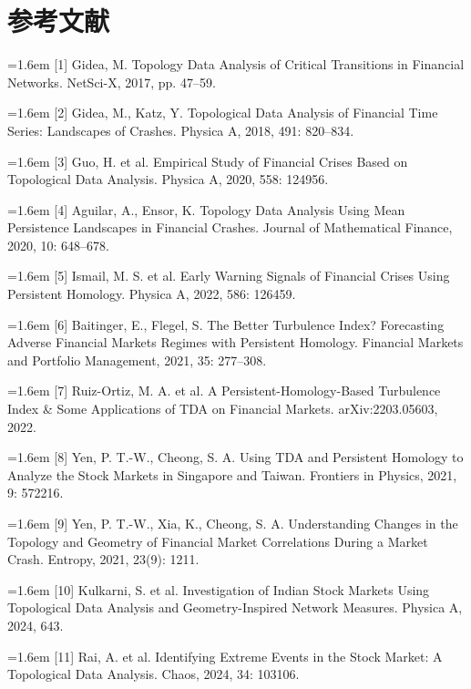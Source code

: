 \documentclass[12pt,a4paper]{ctexart}
\begin{document}
\section{参考文献}
\noindent\hangindent=1.6em [1] Gidea, M. Topology Data Analysis of Critical Transitions in Financial Networks. NetSci-X, 2017, pp. 47–59.\par
\noindent\hangindent=1.6em [2] Gidea, M., Katz, Y. Topological Data Analysis of Financial Time Series: Landscapes of Crashes. Physica A, 2018, 491: 820–834.\par
\noindent\hangindent=1.6em [3] Guo, H. et al. Empirical Study of Financial Crises Based on Topological Data Analysis. Physica A, 2020, 558: 124956.\par
\noindent\hangindent=1.6em [4] Aguilar, A., Ensor, K. Topology Data Analysis Using Mean Persistence Landscapes in Financial Crashes. Journal of Mathematical Finance, 2020, 10: 648–678.\par
\noindent\hangindent=1.6em [5] Ismail, M. S. et al. Early Warning Signals of Financial Crises Using Persistent Homology. Physica A, 2022, 586: 126459.\par
\noindent\hangindent=1.6em [6] Baitinger, E., Flegel, S. The Better Turbulence Index? Forecasting Adverse Financial Markets Regimes with Persistent Homology. Financial Markets and Portfolio Management, 2021, 35: 277–308.\par
\noindent\hangindent=1.6em [7] Ruiz-Ortiz, M. A. et al. A Persistent-Homology-Based Turbulence Index \& Some Applications of TDA on Financial Markets. arXiv:2203.05603, 2022.\par
\noindent\hangindent=1.6em [8] Yen, P. T.-W., Cheong, S. A. Using TDA and Persistent Homology to Analyze the Stock Markets in Singapore and Taiwan. Frontiers in Physics, 2021, 9: 572216.\par
\noindent\hangindent=1.6em [9] Yen, P. T.-W., Xia, K., Cheong, S. A. Understanding Changes in the Topology and Geometry of Financial Market Correlations During a Market Crash. Entropy, 2021, 23(9): 1211.\par
\noindent\hangindent=1.6em [10] Kulkarni, S. et al. Investigation of Indian Stock Markets Using Topological Data Analysis and Geometry-Inspired Network Measures. Physica A, 2024, 643.\par
\noindent\hangindent=1.6em [11] Rai, A. et al. Identifying Extreme Events in the Stock Market: A Topological Data Analysis. Chaos, 2024, 34: 103106.\par
\end{document}
